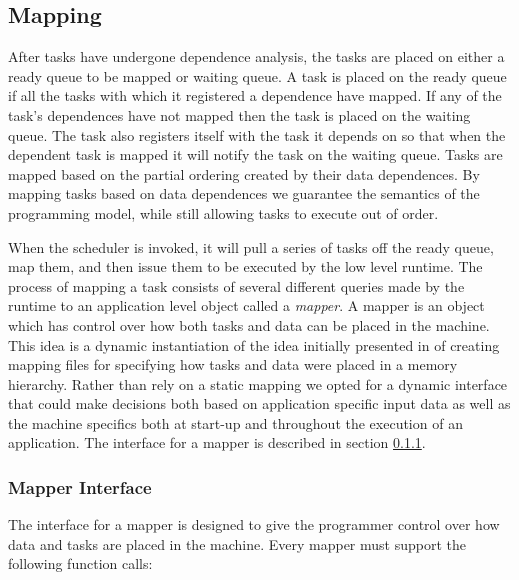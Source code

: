 \subsection{Mapping}
\label{subsec:mapping}
After tasks have undergone dependence analysis, the tasks are placed on either a ready
queue to be mapped or waiting queue.  A task is placed on the ready queue if all the tasks with
which it registered a dependence have mapped.  If any of the task's dependences have
not mapped then the task is placed on the waiting queue.  The task also registers
itself with the task it depends on so that when the dependent task is mapped it will notify
the task on the waiting queue. Tasks are mapped based on the partial ordering created by 
their data dependences.  By mapping tasks based on data dependences we guarantee the 
semantics of the programming model, while still allowing tasks to execute out of order.

When the scheduler is invoked, it will pull a series of tasks off the ready queue, map them,
and then issue them to be executed by the low level runtime.  The process of mapping a task
consists of several different queries made by the runtime to an application level object
called a {\em mapper}.  A mapper is an object which has control over how both tasks and
data can be placed in the machine.  This idea is a dynamic instantiation of the idea
initially presented in \cite{Fatahalian06} of creating mapping files for specifying how
tasks and data were placed in a memory hierarchy.  Rather than rely on a static mapping
we opted for a dynamic interface that could make decisions both based on application specific
input data as well as the machine specifics both at start-up and throughout the execution
of an application.  The interface for a mapper is described in section \ref{subsec:mapinter}.

\subsubsection{Mapper Interface}
\label{subsec:mapinter}
The interface for a mapper is designed to give the programmer control over how data and tasks
are placed in the machine.  Every mapper must support the following function calls:

